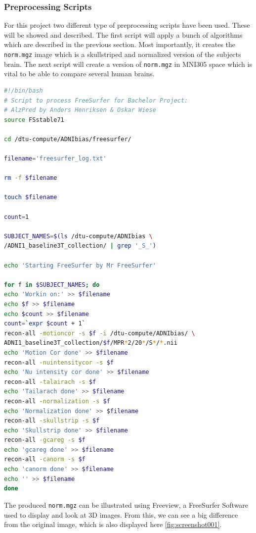 \documentclass[12pt, fleqn, titlepage]{article}
\begin{document}
\subsubsection{Preprocessing Scripts}

For this project two different type of preprocessing scripts have been used. These will be showed and described. The first script will apply a bunch of algorithms which are described in the previous section. Most importantly, it creates the \texttt{norm.mgz} image which is a skullstriped and normalized version of the subjects brain. The next script will create a version of \texttt{norm.mgz} in MNI305 space which is vital to be able to compare several human brains.

\begin{lstlisting}[language=bash,caption={FreeSurfer Preprocessing}]
#!/bin/bash 
# Script to process FreeSurfer for Bachelor Project:
# AlzPred by Anders Henriksen & Oskar Wiese
source FSstable71

cd /dtu-compute/ADNIbias/freesurfer/

filename='freesurfer_log.txt'

rm -f $filename

touch $filename

count=1

SUBJECT_NAMES=$(ls /dtu-compute/ADNIbias \ 
/ADNI1_baseline3T_collection/ | grep '_S_')

echo 'Starting FreeSurfer by Mr FreeSurfer' 

for f in $SUBJECT_NAMES; do
echo 'Workin on:' >> $filename
echo $f >> $filename
echo $count >> $filename 
count=`expr $count + 1`
recon-all -motioncor -s $f -i /dtu-compute/ADNIbias/ \
ADNI1_baseline3T_collection/$f/MPR*2/20*/S*/*.nii 
echo 'Motion Cor done' >> $filename
recon-all -nuintensitycor -s $f  
echo 'Nu intensity cor done' >> $filename
recon-all -talairach -s $f 
echo 'Tailarach done' >> $filename
recon-all -normalization -s $f 
echo 'Normalization done' >> $filename
recon-all -skullstrip -s $f     
echo 'Skullstrip done' >> $filename
recon-all -gcareg -s $f  
echo 'gcareg done' >> $filename
recon-all -canorm -s $f  
echo 'canorm done' >> $filename
echo '' >> $filename
done 
\end{lstlisting}

\noindent
The produced \texttt{norm.mgz} can be illustrated using Freeview, a FreeSurfer Software used to display and look at 3D images. From this, we can see a big difference from the original image, which is also displayed here \ref{fig:screenshot001}.
\end{document}
